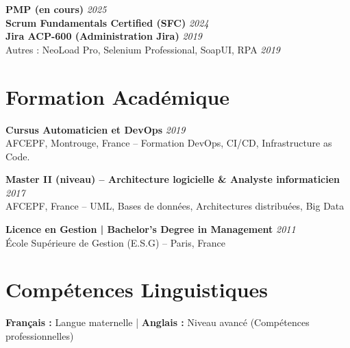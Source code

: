 \documentclass[11pt,a4paper]{article}
\begin{document}
\textbf{PMP (en cours)} \hfill \textit{\color{mediumgray}2025}\\
\textbf{Scrum Fundamentals Certified (SFC)} \hfill \textit{\color{mediumgray}2024}\\
\textbf{Jira ACP-600 (Administration Jira)} \hfill \textit{\color{mediumgray}2019}\\
Autres : NeoLoad Pro, Selenium Professional, SoapUI, RPA \hfill \textit{\color{mediumgray}2019}

\section*{Formation Académique}

\textbf{Cursus Automaticien et DevOps} \hfill \textit{\color{mediumgray}2019}\\
AFCEPF, Montrouge, France -- Formation DevOps, CI/CD, Infrastructure as Code. 

\textbf{Master II (niveau) -- Architecture logicielle \& Analyste informaticien} \hfill \textit{\color{mediumgray}2017}\\
AFCEPF, France -- UML, Bases de données, Architectures distribuées, Big Data

\textbf{Licence en Gestion | Bachelor's Degree in Management} \hfill \textit{\color{mediumgray}2011}\\
École Supérieure de Gestion (E.S.G) -- Paris, France

\vspace{6pt}

\section*{Compétences Linguistiques}

\textbf{Français :} Langue maternelle \quad | \quad \textbf{Anglais :} Niveau avancé (Compétences professionnelles)
\end{document}
